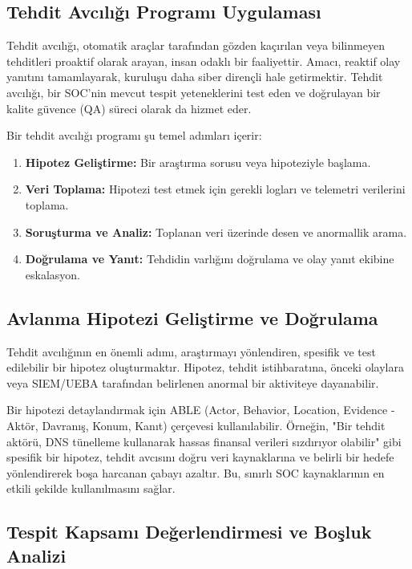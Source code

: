 \subsection{Tehdit Avcılığı Programı Uygulaması}

Tehdit avcılığı, otomatik araçlar tarafından gözden kaçırılan veya bilinmeyen tehditleri proaktif olarak arayan, insan odaklı bir faaliyettir. Amacı, reaktif olay yanıtını tamamlayarak, kuruluşu daha siber dirençli hale getirmektir. Tehdit avcılığı, bir SOC'nin mevcut tespit yeteneklerini test eden ve doğrulayan bir kalite güvence (QA) süreci olarak da hizmet eder.

Bir tehdit avcılığı programı şu temel adımları içerir:
\begin{enumerate}
    \item \textbf{Hipotez Geliştirme:} Bir araştırma sorusu veya hipoteziyle başlama.
    \item \textbf{Veri Toplama:} Hipotezi test etmek için gerekli logları ve telemetri verilerini toplama.
    \item \textbf{Soruşturma ve Analiz:} Toplanan veri üzerinde desen ve anormallik arama.
    \item \textbf{Doğrulama ve Yanıt:} Tehdidin varlığını doğrulama ve olay yanıt ekibine eskalasyon.
\end{enumerate}

\subsection{Avlanma Hipotezi Geliştirme ve Doğrulama}

Tehdit avcılığının en önemli adımı, araştırmayı yönlendiren, spesifik ve test edilebilir bir hipotez oluşturmaktır. Hipotez, tehdit istihbaratına, önceki olaylara veya SIEM/UEBA tarafından belirlenen anormal bir aktiviteye dayanabilir.

Bir hipotezi detaylandırmak için ABLE (Actor, Behavior, Location, Evidence - Aktör, Davranış, Konum, Kanıt) çerçevesi kullanılabilir. Örneğin, "Bir tehdit aktörü, DNS tünelleme kullanarak hassas finansal verileri sızdırıyor olabilir" gibi spesifik bir hipotez, tehdit avcısını doğru veri kaynaklarına ve belirli bir hedefe yönlendirerek boşa harcanan çabayı azaltır. Bu, sınırlı SOC kaynaklarının en etkili şekilde kullanılmasını sağlar.

\subsection{Tespit Kapsamı Değerlendirmesi ve Boşluk Analizi}

